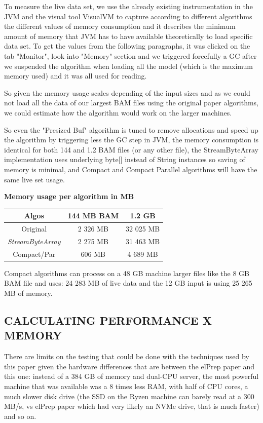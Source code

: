 \documentclass[a4paper,twoside]{article}
\begin{document}
To measure the live data set, we use the already existing instrumentation in the JVM and the visual tool
VisualVM to capture according to different algorithms the different values of memory consumption and it describes the minimum amount of memory that JVM has to have available theoretically to load specific data set. To get the values from the following paragraphs, it was clicked on the tab "Monitor", look into "Memory" section and we triggered forcefully a GC after we suspended the algorithm when loading all the model (which is the maximum memory used) and it was all used for reading.

So given the memory usage scales depending of the input sizes and as we could not load all the data of
our largest BAM files using the original paper algorithms, we could estimate how the algorithm would work on the larger machines.

So even the "Presized Buf" algorithm is tuned to remove allocations and speed up the algorithm by triggering less the GC step in JVM, the memory consumption is identical for both 144 and 1.2 BAM files (or any other file), the StreamByteArray implementation uses underlying byte[] instead of String instances so saving of memory is minimal, and Compact and Compact Parallel algorithms will have the same live set usage.


\begin{small}
	\par
	\textbf{Memory usage per algorithm in MB} \\
	\vspace{-0.4cm}
	\begin{center}
		\begin{tabular}{|c|c|c|}
			\hline
			Algos  	    	 	& 144 MB BAM		& 1.2 GB			\\ \hline
			Original				& 2 326 MB			& 32 025 MB			\\ \hline
			{\it StreamByteArray}	& 2 275 MB			& 31 463 MB			\\ \hline
			Compact/Par				& 606 MB			& 4 689 MB			\\ \hline
		\end{tabular}
	\end{center}
\end{small}

Compact algorithms can process on a 48 GB machine larger files like the 8 GB BAM file and uses:
24 283 MB of live data and the 12 GB input is using 25 265 MB of memory.

\subsection{\uppercase{Calculating performance x memory}}
There are limits on the testing that could be done with the techniques used by this paper given the hardware differences that are between the elPrep paper and this one: instead of a 384 GB of memory and dual-CPU server,
the most powerful machine that was available was a 8 times less RAM, with half of CPU cores, a much
slower disk drive (the SSD on the Ryzen machine can barely read at a 300 MB/s, vs elPrep paper which had
very likely an NVMe drive, that is much faster) and so on.
\end{document}
